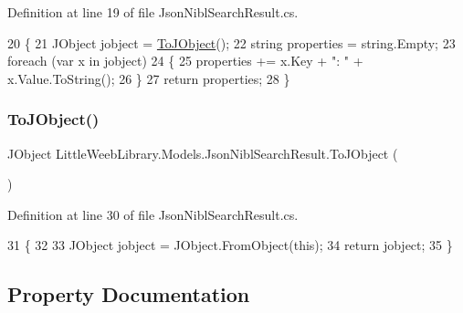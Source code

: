 Definition at line 19 of file Json\+Nibl\+Search\+Result.\+cs.


\begin{DoxyCode}
20         \{
21             JObject jobject = \mbox{\hyperlink{class_little_weeb_library_1_1_models_1_1_json_nibl_search_result_a7041262210bce963fd7291a826761891}{ToJObject}}();
22             \textcolor{keywordtype}{string} properties = \textcolor{keywordtype}{string}.Empty;
23             \textcolor{keywordflow}{foreach} (var x \textcolor{keywordflow}{in} jobject)
24             \{
25                 properties += x.Key + \textcolor{stringliteral}{": "} + x.Value.ToString();
26             \}
27             \textcolor{keywordflow}{return} properties;
28         \}
\end{DoxyCode}
\mbox{\label{class_little_weeb_library_1_1_models_1_1_json_nibl_search_result_a7041262210bce963fd7291a826761891}} 
\subsubsection{\texorpdfstring{To\+J\+Object()}{ToJObject()}}
{\footnotesize\ttfamily J\+Object Little\+Weeb\+Library.\+Models.\+Json\+Nibl\+Search\+Result.\+To\+J\+Object (\begin{DoxyParamCaption}{ }\end{DoxyParamCaption})}



Definition at line 30 of file Json\+Nibl\+Search\+Result.\+cs.


\begin{DoxyCode}
31         \{
32 
33             JObject jobject = JObject.FromObject(\textcolor{keyword}{this});
34             \textcolor{keywordflow}{return} jobject;
35         \}
\end{DoxyCode}


\subsection{Property Documentation}
\mbox{\label{class_little_weeb_library_1_1_models_1_1_json_nibl_search_result_add369f2f54514df06e35ed94c057f66c}} 
